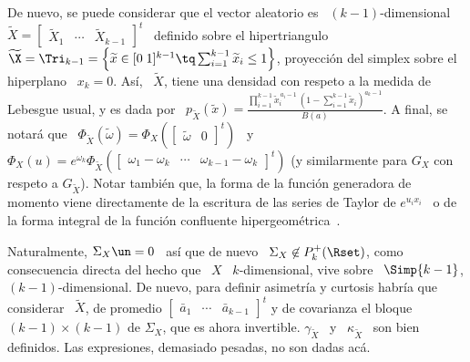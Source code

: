 
De nuevo, se puede considerar que el vector aleatorio es \ $(k-1)$-dimensional \
$\widetilde{X}     =    \begin{bmatrix}     \widetilde{X}_1    &     \cdots    &
  \widetilde{X}_{k-1}  \end{bmatrix}^t$  \ definido  sobre  el hipertriangulo  \
$\widetilde{\X}  = \Tri_{k-1}  = \left\{  \widetilde{x} \in  [0 \;  1]^{k-1} \tq
  \sum_{i=1}^{k-1}  \widetilde{x}_i \le  1 \right\}$,  proyecci\'on  del simplex
sobre el  hiperplano \ $x_k =  0$. As\'i, \ $\widetilde{X}$,  tiene una densidad
con   respeto   a   la  medida   de   Lebesgue   usual,   y   es  dada   por   \
$p_{\widetilde{X}}\left(   \widetilde{x}   \right)   =   \frac{\prod_{i=1}^{k-1}
  \widetilde{x}_i^{\,  a_i-1}  \, \left(  1  - \sum_{i=1}^{k-1}  \widetilde{x}_i
  \right)^{a_k-1}}{B(a)}$.      A      final,     se     notar\'a      que     \
$\Phi_{\widetilde{X}}\left(         \widetilde{\omega}         \right)         =
\Phi_X\left( \begin{bmatrix} \widetilde{\omega} & 0 \end{bmatrix}^t \right)$ \ y
\ $\Phi_X(u) =  e^{\omega_k} \Phi_{\widetilde{X}}\left( \begin{bmatrix} \omega_1
    - \omega_k  & \cdots &  \omega_{k-1} - \omega_k \end{bmatrix}^t  \right)$ (y
similarmente  para $G_X$  con respeto  a $G_{\widetilde{X}}$).   Notar tambi\'en
que, la  forma de la  funci\'on generadora de  momento viene directamente  de la
escritura de las series  de Taylor de $e^{u_i x_i}$ \ o  de la forma integral de
la funci\'on confluente hipergeom\'etrica~\cite{Phi88}.

Naturalmente,  $\Sigma_X \un  = 0$  \  as\'i que  de nuevo  \ $\Sigma_X  \not\in
P_k^+(\Rset)$, como consecuencia directa del  hecho que \ $X$ \ $k$-dimensional,
vive  sobre   \  $\Simp{k-1}$,  $(k-1)$-dimensional.  De   nuevo,  para  definir
asimetr\'ia y  curtosis habr\'ia que  considerar \ $\widetilde{X}$,  de promedio
$\begin{bmatrix}  \bar{a}_1  &  \cdots  & \bar{a}_{k-1}  \end{bmatrix}^t$  y  de
covarianza  el  bloque  $(k-1)  \times   (k-1)$  de  $\Sigma_X$,  que  es  ahora
invertible. $\gamma_{\widetilde{X}}$  \ y \ $\kappa_{\widetilde{X}}$  \ son bien
definidos. Las expresiones, demasiado pesadas, no son dadas ac\'a.

